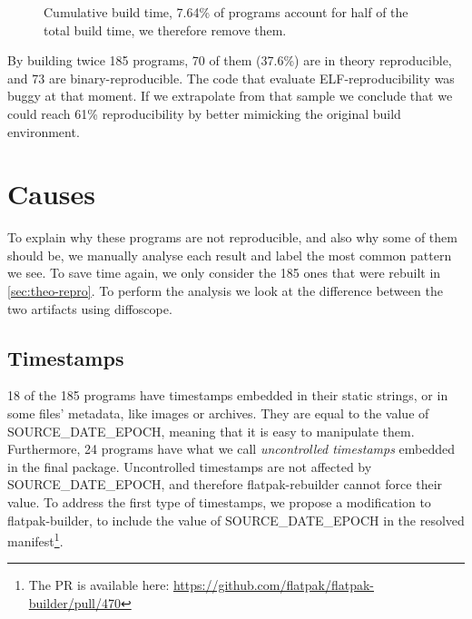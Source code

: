 \documentclass[a4paper,11pt,oneside]{report}
\theoremstyle{definition}
\newcommand{\sysname}{flatpak-rebuilder\xspace}
\newcommand{\fb}{flatpak-builder\xspace}
\newcommand{\sde}{SOURCE\_DATE\_EPOCH\xspace}
\newcommand{\dfc}{diffoscope\xspace}
\begin{document}
\begin{figure}[h]
    \caption{Cumulative build time, 7.64\% of programs
    account for half of the total build time, we therefore remove them.}
    \label{fig:buildtime}
\end{figure}

By building twice 185 programs, 70 of them (37.6\%) are in theory reproducible,
and 73 are binary-reproducible. The code that evaluate ELF-reproducibility was
buggy at that moment. If we extrapolate from that sample we conclude that we
could reach 61\% reproducibility by better mimicking the original build
environment.

\section{Causes}
To explain why these programs are not reproducible, and also why some of them
should be, we manually analyse each result and label the most common pattern we
see. To save time again, we only consider the 185 ones that were rebuilt in
\autoref{sec:theo-repro}. To perform the analysis we look at the difference
between the two artifacts using \dfc.

\subsection*{Timestamps}
18 of the 185 programs have timestamps embedded in their static strings, or in
some files' metadata, like images or archives. They are equal to the value of
\sde, meaning that it is easy to manipulate them. Furthermore, 24 programs have
what we call \emph{uncontrolled timestamps} embedded in the final package.
Uncontrolled timestamps are not affected by \sde, and therefore \sysname cannot
force their value. To address the first type of timestamps, we propose a
modification to \fb, to include the value of \sde in the resolved
manifest\footnote{The PR is available here:
\url{https://github.com/flatpak/flatpak-builder/pull/470}}.
\end{document}
